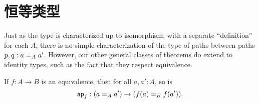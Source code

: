 %
%

\section{恒等类型}
\label{sec:compute-paths}

%
Just as the type  is characterized up to isomorphism, with
a separate ``definition'' for each $A$, there is no simple
characterization of the type  of paths between
paths $p,q : \id[A]{a}{a'}$.
However, our other general classes of theorems do extend to identity types, such as the fact that they respect equivalence.

\begin{thm}\label{thm:paths-respects-equiv}
  If $f : A \to B$ is an equivalence, then for all $a,a':A$, so is
  \[\apfunc{f} : (\id[A]{a}{a'}) \to (\id[B]{f(a)}{f(a')}).\]
\end{thm}

